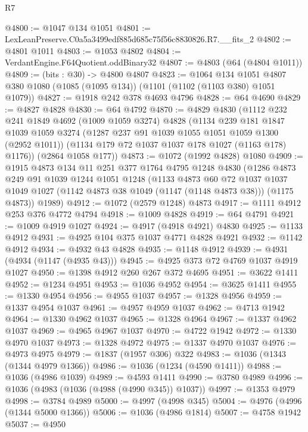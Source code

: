 \begin{lexlean}{R7}
\begin{coremodule}
@4800 := @1047 @134 @1051
@4801 := LexLeanPreserve.C0a5a3499edf885d685c75f56c8830826.R7.__fits_2
@4802 := @4801 @1011
@4803 := @1053 @4802
@4804 := VerdantEngine.F64Quotient.oddBinary32
@4807 := @4803 (@64 (@4804 @1011))
@4809 := (bits : @30) -> @4800 @4807
@4823 := @1064
    @134
    @1051
    @4807
    @380
    @1080
    (@1085 (@1095 @134))
    (@1101 (@1102 (@1103 @380) @1051 @1079))
@4827 := @1918 @242 @378 @4693 @4796
@4828 := @64 @4690
@4829 := @4827 @4828
@4830 := @64 @4792
@4870 := @4829
    @4830
    (@1112
      @232
      @241
      @1849
      @4692
      (@1009 @1059 @3274)
      @4828
      (@1134
        @239
        @181
        @1847
        @1039
        @1059
        @3274
        (@1287 @237 @91 @1039 @1055 @1051 @1059 @1300 (@2952 @1011))
        (@1134 @179 @72 @1037 @1037 @178 @1027 (@1163 @178) @1176))
      (@2864 @1058 @177))
@4873 := @1072 (@1992 @4828) @1080
@4909 := @1915
    @4873
    @134
    @11
    @251
    @377
    @1764
    @4795
    @1248
    @4830
    (@1286
      @4873
      @249
      @91
      @1039
      @1244
      @1051
      @1248
      (@1133
        @4873
        @60
        @72
        @1037
        @1037
        @1049
        @1027
        (@1142 @4873 @38 @1049 (@1147 (@1148 @4873 @38)))
        (@1175 @4873))
      @1989)
@4912 := @1072 (@2579 @1248) @4873
@4917 := @1111 @4912 @253 @376 @4772 @4794
@4918 := @1009 @4828
@4919 := @64 @4791
@4921 := @1009 @4919 @1027
@4924 := @4917 (@4918 @4921) @4830
@4925 := @1133 @4912
@4931 := @4925 @104 @375 @1037 @4771 @4828 @4921
@4932 := @1142 @4912
@4934 := @4932 @43 @4828
@4935 := @1148 @4912
@4939 := @4931 (@4934 (@1147 (@4935 @43)))
@4945 := @4925 @373 @72 @4769 @1037 @4919 @1027
@4950 := @1398 @4912 @260 @267 @372 @4695
@4951 := @3622 @1411
@4952 := @1234 @4951
@4953 := @1036 @4952
@4954 := @3625 @1411
@4955 := @1330 @4954
@4956 := @4955 @1037
@4957 := @1328 @4956
@4959 := @1337 @4954 @1037
@4961 := @4957 @4959 @1037
@4962 := @4713 @1942
@4964 := @1330 @4962 @1037
@4965 := @1328 @4964
@4967 := @1337 @4962 @1037
@4969 := @4965 @4967 @1037
@4970 := @4722 @1942
@4972 := @1330 @4970 @1037
@4973 := @1328 @4972
@4975 := @1337 @4970 @1037
@4976 := @4973 @4975
@4979 := @1837 (@1957 @306) @322
@4983 := @1036 (@1343 (@1344 @4979 @1366))
@4986 := @1036 (@1234 (@4590 @1411))
@4988 := @1036 (@4986 @1039)
@4989 := @4593 @1411
@4990 := @3780 @4989
@4996 := @1036 (@4983 (@1036 (@4988 (@4990 @345)) @1037))
@4997 := @1353 @4979
@4998 := @3784 @4989
@5000 := @4997 (@4998 @345)
@5004 := @4976 (@4996 (@1344 @5000 @1366))
@5006 := @1036 (@4986 @1814)
@5007 := @4758 @1942
@5037 := @4950

\end{coremodule}
\end{lexlean}
